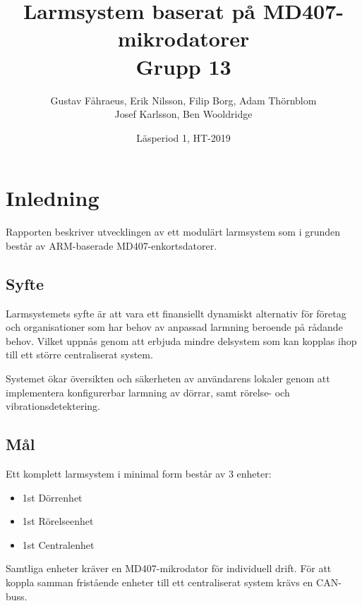 \documentclass{article}
\title{Larmsystem baserat på MD407-mikrodatorer\\
\large Grupp 13}
\author{Gustav Fåhraeus, Erik Nilsson, Filip Borg, Adam Thörnblom\\
Josef Karlsson, Ben Wooldridge}
\date{Läsperiod 1, HT-2019}
\begin{document}
\maketitle
{}
\newpage

\tableofcontents
\newpage



\section{Inledning}
Rapporten beskriver utvecklingen av ett modulärt larmsystem som i grunden
 \newline består av ARM-baserade MD407-enkortsdatorer.

\subsection{Syfte} %
Larmsystemets syfte är att vara ett finansiellt dynamiskt alternativ för företag och organisationer som har behov av anpassad larmning beroende på rådande behov. Vilket uppnås genom att erbjuda mindre delsystem som kan kopplas ihop till ett större centraliserat system.

Systemet ökar översikten och säkerheten av användarens lokaler genom \newline att 
implementera konfigurerbar larmning av dörrar, samt rörelse- och vibrationsdetektering.

\subsection{Mål} %
Ett komplett larmsystem i minimal form består av 3 enheter:
\begin{itemize}
    \item 1st Dörrenhet
    \item 1st Rörelseenhet
    \item 1st Centralenhet
\end{itemize}
Samtliga enheter kräver en MD407-mikrodator för individuell drift. För att koppla samman fristående enheter till ett centraliserat system krävs en CAN-buss.
\end{document}
